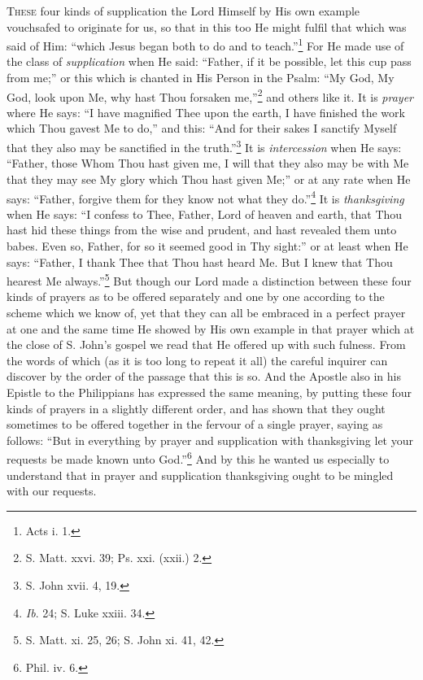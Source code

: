 \textsc{These} four kinds of supplication the Lord Himself by His own example vouchsafed to originate for us, so that in this too He might fulfil that which was said of Him: “which Jesus began both to do and to teach.”\footnote{Acts i. 1.} For He made use of the class of \emph{supplication} when He said: “Father, if it be possible, let this cup pass from me;” or this which is chanted in His Person in the Psalm: “My God, My God, look upon Me, why hast Thou forsaken me,”\footnote{S. Matt. xxvi. 39; Ps. xxi. (xxii.) 2.} and others like it. It is \emph{prayer} where He says: “I have magnified Thee upon the earth, I have finished the work which Thou gavest Me to do,” and this: “And for their sakes I sanctify Myself that they also may be sanctified in the truth.”\footnote{S. John xvii. 4, 19.} It is \emph{intercession} when He says: “Father, those Whom Thou hast given me, I will that they also may be with Me that they may see My glory which Thou hast given Me;” or at any rate when He says: “Father, forgive them for they know not what they do.”\footnote{\emph{Ib}. 24; S. Luke xxiii. 34.} It is \emph{thanksgiving} when He says: “I confess to Thee, Father, Lord of heaven and earth, that Thou hast hid these things from the wise and prudent, and hast revealed them unto babes. Even so, Father, for so it seemed good in Thy sight:” or at least when He says: “Father, I thank Thee that Thou hast heard Me. But I knew that Thou hearest Me always.”\footnote{S. Matt. xi. 25, 26; S. John xi. 41, 42.} But though our Lord made a distinction between these four kinds of prayers as to be offered separately and one by one according to the scheme which we know of, yet that they can all be embraced in a perfect prayer at one and the same time He showed by His own example in that prayer which at the close of S. John’s gospel we read that He offered up with such fulness. From the words of which (as it is too long to repeat it all) the careful inquirer can discover by the order of the passage that this is so. And the Apostle also in his Epistle to the Philippians has expressed the same meaning, by putting these four kinds of prayers in a slightly different order, and has shown that they ought sometimes to be offered together in the fervour of a single prayer, saying as follows: “But in everything by prayer and supplication with thanksgiving let your requests be made known unto God.”\footnote{Phil. iv. 6.} And by this he wanted us especially to understand that in prayer and supplication thanksgiving ought to be mingled with our requests.



